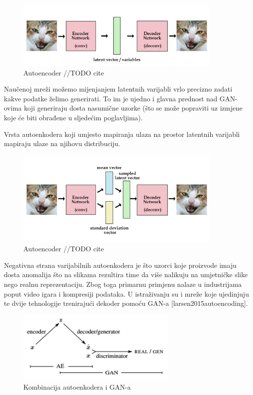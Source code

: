 \documentclass[lmodern, utf8, seminar]{fer}
\begin{document}
\begin{figure}[H]
    \centering
    \includegraphics[width=0.9\textwidth]{autoenc}
    \caption{Autoencoder //TODO cite}
    \label{fig:autoenc}
\end{figure}

Naučenoj mreži možemo mijenjanjem latentnih varijabli vrlo precizno zadati kakve podatke želimo generirati. To im je ujedno i glavna prednost nad GAN-ovima koji generiraju dosta nasumične uzorke (što se može popraviti uz izmjene koje će biti obrađene u sljedećim poglavljima).
\newline

Vrsta autoenkodera koji umjesto mapiranja ulaza na prostor latentnih varijabli mapiraju ulaze na njihovu distribuciju.

\begin{figure}[H]
    \centering
    \includegraphics[width=0.9\textwidth]{vae}
    \caption{Autoencoder //TODO cite}
    \label{fig:vae}
\end{figure}

Negativna strana varijabilnih autoenkodera je što uzorci koje proizvode imaju dosta anomalija što na slikama rezultira time da više nalikuju na umjetničke slike nego realnu reprezentaciju. Zbog toga primarnu primjenu nalaze u industrijama poput video igara i kompresiji podataka. U istraživanju su i mreže koje ujedinjuju te dvije tehnologije trenirajući dekoder pomoću GAN-a [larsen2015autoencoding].

\begin{figure}[H]
    \centering
    \includegraphics[width=0.7\textwidth]{vae-gan}
    \caption{Kombinacija autoenkodera i GAN-a}
    \label{fig:vae-gan}
\end{figure}
\end{document}

